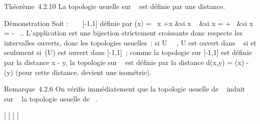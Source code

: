 \documentclass[]{article}
\begin{document}
Théorème~4.2.10 La topologie usuelle sur \overline{}~
est définie par une distance.

Démonstration Soit \phi : \overline{}~ \rightarrow~ [-1,1]
définie par \phi(x) = \left \
\cases  x +x &si x \in {}~  &si x = +\infty~
 &si x = -\infty~ \cr 
\right .. L'application \phi est une bijection strictement
croissante donc respecte les intervalles ouverts, donc les topologies
usuelles~: si U \subset~\overline{}~, U est ouvert dans
\overline\mathbb{R}~ si et seulement si~\phi(U) est ouvert dans
[-1,1]~; comme la topologie sur [-1,1] est définie par la
distance x - y, la topologie sur
\overline{}~ est définie par la distance d(x,y) =
\phi(x) - \phi(y) (pour cette distance, \phi devient une
isométrie).

Remarque~4.2.6 On vérifie immédiatement que la topologie usuelle de
\overline{}~ induit sur ~ la topologie usuelle de \mathbb{R}~.

[
[
[
[
\end{document}
